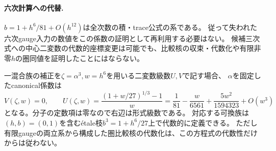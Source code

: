 \paragraph{六次計算への代替.}
$b=1+h^6/81+O(h^{12})$は全次数の積・trace公式の系である。
従って失われた六次gauge入力の数値をこの係数の証明として再利用する必要はない。
候補三次式への中心二変数の代数的座標変更は可能でも、比較核の収束・代数化や有限非零$h$の圏同値を証明したことにはならない。

\begin{corollary}[二変数正規形の一変数化]
一混合族の補正を$\zeta=\alpha^3,w=h^6$を用いる二変数級数$U,V$で記す場合、
$\alpha$を固定したcanonical係数は
\[
 V(\zeta,w)=0,\qquad
 U(\zeta,w)=\frac{(1+w/27)^{1/3}-1}{w}
 =\frac1{81}-\frac{w}{6561}+\frac{5w^2}{1594323}+O(w^3)
\]
となる。分子の定数項は零なので右辺は形式級数である。
対応する可換族は$(h,b)=(0,1)$を含むétale枝$b^3=1+h^6/27$上で代数的に定義できる。
ただし有限gaugeの両立系から構成した圏比較核の代数化は、この方程式の代数性だけからは従わない。
\end{corollary}
